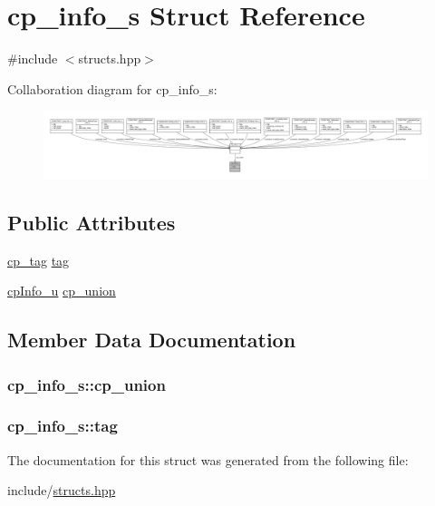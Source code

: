 \hypertarget{structcp__info__s}{\section{cp\+\_\+info\+\_\+s Struct Reference}
\label{structcp__info__s}
}


{\ttfamily \#include $<$structs.\+hpp$>$}



Collaboration diagram for cp\+\_\+info\+\_\+s\+:\nopagebreak
\begin{figure}[H]
\begin{center}
\leavevmode
\includegraphics[width=350pt]{structcp__info__s__coll__graph}
\end{center}
\end{figure}
\subsection*{Public Attributes}
\begin{DoxyCompactItemize}
\item 
\hyperlink{structs_8hpp_a17947ec3f3c1f2392eabd36c1ba5fec6}{cp\+\_\+tag} \hyperlink{structcp__info__s_a6b3587f422119dbdd9fa778d383c787a}{tag}
\item 
\hyperlink{structs_8hpp_af9cb1bd49e931147183cfb411f105f09}{cp\+Info\+\_\+u} \hyperlink{structcp__info__s_a099688c74e2156e544e235b636f68f8a}{cp\+\_\+union}
\end{DoxyCompactItemize}


\subsection{Member Data Documentation}
\hypertarget{structcp__info__s_a099688c74e2156e544e235b636f68f8a}{
\subsubsection[{cp\+\_\+union}]{ cp\+\_\+info\+\_\+s\+::cp\+\_\+union}}\label{structcp__info__s_a099688c74e2156e544e235b636f68f8a}
\hypertarget{structcp__info__s_a6b3587f422119dbdd9fa778d383c787a}{
\subsubsection[{tag}]{ cp\+\_\+info\+\_\+s\+::tag}}\label{structcp__info__s_a6b3587f422119dbdd9fa778d383c787a}


The documentation for this struct was generated from the following file\+:\begin{DoxyCompactItemize}
\item 
include/\hyperlink{structs_8hpp}{structs.\+hpp}\end{DoxyCompactItemize}

